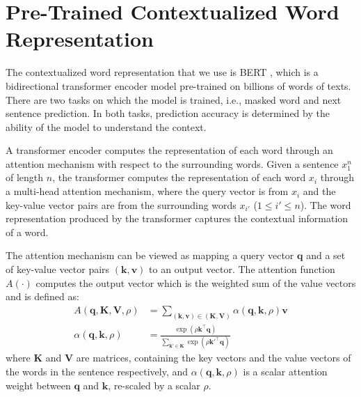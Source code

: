 \documentclass[11pt,a4paper]{article}
\begin{document}
\section{Pre-Trained Contextualized Word Representation}
\label{sec:pretrain}

The contextualized word representation that we use is BERT \cite{devlin_bert:_2019}, which is a bidirectional transformer encoder model \cite{vaswani_attention_2017} pre-trained on billions of words of texts. There are two tasks on which the model is trained, i.e., masked word and next sentence prediction. In both tasks, prediction accuracy is determined by the ability of the model to understand the context.

A transformer encoder computes the representation of each word through an attention mechanism with respect to the surrounding words. Given a sentence $x^n_1$ of length $n$, the transformer computes the representation of each word $x_i$ through a multi-head attention mechanism, where the query vector is from $x_i$ and the key-value vector pairs are from the surrounding words $x_{i'}$ ($1 \le i' \le n$). The word representation produced by the transformer captures the contextual information of a word.

The attention mechanism can be viewed as mapping a query vector $\mathbf{q}$ and a set of key-value vector pairs $(\mathbf{k}, \mathbf{v})$ to an output vector. The attention function $A(\cdot)$ computes the output vector which is the weighted sum of the value vectors and is defined as:
\begin{align}
\label{eq:att}
A(\mathbf{q}, \mathbf{K}, \mathbf{V}, \rho) &= \sum_{(\mathbf{k}, \mathbf{v}) \in (\mathbf{K}, \mathbf{V})}{\alpha(\mathbf{q}, \mathbf{k}, \rho) \mathbf{v}} \\
\alpha(\mathbf{q}, \mathbf{k}, \rho) &= \frac{\exp(\rho \mathbf{k}^\top \mathbf{q})}{\sum_{\mathbf{k}' \in \mathbf{K}}{\exp(\rho \mathbf{k}'^\top \mathbf{q})}}
\end{align}
where $\mathbf{K}$ and $\mathbf{V}$ are matrices, containing the key vectors and the value vectors of the words in the sentence respectively, and $\alpha(\mathbf{q}, \mathbf{k}, \rho)$ is a scalar attention weight between $\mathbf{q}$ and $\mathbf{k}$, re-scaled by a scalar $\rho$.
\end{document}
